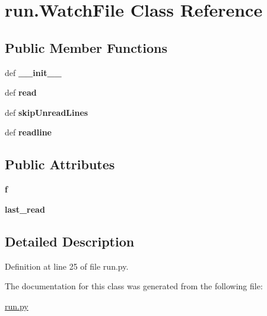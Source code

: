 \hypertarget{classrun_1_1_watch_file}{
\section{run.WatchFile Class Reference}
\label{classrun_1_1_watch_file}
}
\subsection*{Public Member Functions}
\begin{DoxyCompactItemize}
\item 
\hypertarget{classrun_1_1_watch_file_a0a33ec665757d1237fb0a616b27c3d88}{
def {\bfseries \_\-\_\-init\_\-\_\-}}
\label{classrun_1_1_watch_file_a0a33ec665757d1237fb0a616b27c3d88}

\item 
\hypertarget{classrun_1_1_watch_file_adbe75c1f0d71f3fa33d9bc9d99533021}{
def {\bfseries read}}
\label{classrun_1_1_watch_file_adbe75c1f0d71f3fa33d9bc9d99533021}

\item 
\hypertarget{classrun_1_1_watch_file_ac78d1f471640d0dd6cec71fa3794af07}{
def {\bfseries skipUnreadLines}}
\label{classrun_1_1_watch_file_ac78d1f471640d0dd6cec71fa3794af07}

\item 
\hypertarget{classrun_1_1_watch_file_abcff3cf052a255e755ca3ce009a59049}{
def {\bfseries readline}}
\label{classrun_1_1_watch_file_abcff3cf052a255e755ca3ce009a59049}

\end{DoxyCompactItemize}
\subsection*{Public Attributes}
\begin{DoxyCompactItemize}
\item 
\hypertarget{classrun_1_1_watch_file_aec0f2ff6f53a437f40e6d4d49cb2ab93}{
{\bfseries f}}
\label{classrun_1_1_watch_file_aec0f2ff6f53a437f40e6d4d49cb2ab93}

\item 
\hypertarget{classrun_1_1_watch_file_ab3431a0c63d34f51d1660fcfdab53411}{
{\bfseries last\_\-read}}
\label{classrun_1_1_watch_file_ab3431a0c63d34f51d1660fcfdab53411}

\end{DoxyCompactItemize}


\subsection{Detailed Description}


Definition at line 25 of file run.py.



The documentation for this class was generated from the following file:\begin{DoxyCompactItemize}
\item 
\hyperlink{run_8py}{run.py}\end{DoxyCompactItemize}
